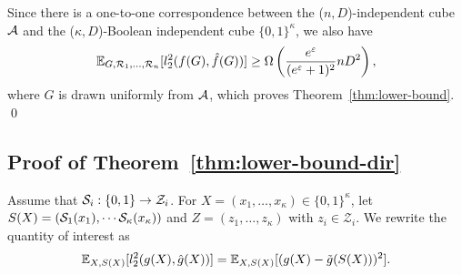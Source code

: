 {Since 
there is a one-to-one correspondence between the ($n,D$)-independent cube $\mathcal{A}$ 
and 
the ($\kappa,D$)-Boolean independent cube $\{0,1\}^\kappa$, we also have 
\[
  \mathbb{E}_{G,\mathcal{R}_1, \ldots, \mathcal{R}_n}[l_2^2(f(G), \hat{f}(G))] \geq \Omega \left(
  \frac{e^{\varepsilon}}{(e^{\varepsilon}+1)^2} n D^2 \right),
\]
where $G$ is drawn uniformly from $\mathcal{A}$, which proves Theorem~\ref{thm:lower-bound}. \qed

\subsection{Proof of
Theorem~\ref{thm:lower-bound-dir}}
\label{sub:proof_thm_lower-bound-dir}

Assume that $\mathcal{S}_i : \{0,1\} \rightarrow \mathcal{Z}_i$.
For 
$X = (x_1, \ldots, x_\kappa) \in \{0,1\}^\kappa$, 
let $S(X) = (\mathcal{S}_1(x_1), \cdots \mathcal{S}_\kappa(x_\kappa))$ and
$Z = (z_1, \ldots, z_\kappa)$ with $z_i \in \mathcal{Z}_i$. 
We rewrite the quantity of interest as
\[
  \mathbb{E}_{X, S(X)}[l_2^2(g(X), \hat{g}(X))] = \mathbb{E}_{X, S(X)}[(g(X)- \tilde{g}(S(X)))^2].
\]

}
